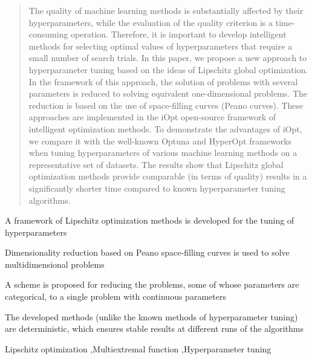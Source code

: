 \documentclass[preprint,12pt]{elsarticle}
\begin{document}
\begin{frontmatter}
\begin{abstract}
The quality of machine learning methods is substantially affected by their hyperparameters, while the evaluation of the quality criterion is a time-consuming operation. Therefore, it is important to develop intelligent methods for selecting optimal values of hyperparameters that require a small number of search trials. In this paper, we propose a new approach to hyperparameter tuning based on the ideas of Lipschitz global optimization. In the framework of this approach, the solution of problems with several parameters is reduced to solving equivalent one-dimensional problems. The reduction is based on the use of space-filling curves (Peano curves). These approaches are implemented in the iOpt open-source framework of intelligent optimization methods.  To demonstrate the advantages of iOpt, we compare it with the well-known Optuna and HyperOpt frameworks when tuning hyperparameters of various machine learning methods on a representative set of datasets. The results show that Lipschitz global optimization methods provide comparable (in terms of quality) results in a significantly shorter time compared to known hyperparameter tuning algorithms.

\end{abstract}


\begin{highlights}
\item A framework of Lipschitz optimization methods is developed for the tuning of hyperparameters
\item Dimensionality reduction based on Peano space-filling curves is used to solve multidimensional problems
\item A scheme is proposed for reducing the problems, some of whose parameters are categorical, to a single problem with continuous parameters
\item The developed methods (unlike the known methods of hyperparameter tuning) are deterministic, which ensures stable results at different runs of the algorithms 

\end{highlights}

\begin{keyword}
Lipschitz optimization \sep Multiextremal function \sep Hyperparameter tuning



\end{keyword}

\end{frontmatter}
\end{document}
